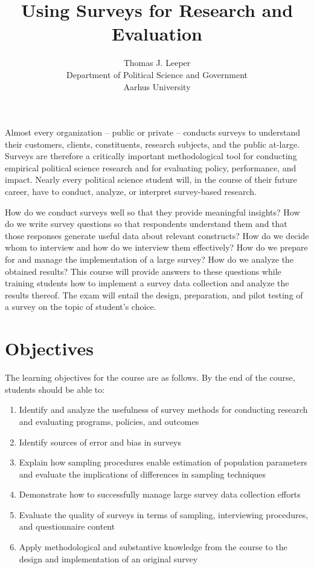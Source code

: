 \documentclass[12pt,a4paper]{article}
\title{Using Surveys for Research and Evaluation}
\author{Thomas J. Leeper\\
Department of Political Science and Government\\
Aarhus University}
\begin{document}
\nobibliography*

\maketitle

\faketableofcontents


Almost every organization – public or private – conducts surveys to understand their customers, clients, constituents, research subjects, and the public at-large. Surveys are therefore a critically important methodological tool for conducting empirical political science research and for evaluating policy, performance, and impact. Nearly every political science student will, in the course of their future career, have to conduct, analyze, or interpret survey-based research.

How do we conduct surveys well so that they provide meaningful insights? How do we write survey questions so that respondents understand them and that those responses generate useful data about relevant constructs? How do we decide whom to interview and how do we interview them effectively? How do we prepare for and manage the implementation of a large survey? How do we analyze the obtained results? This course will provide answers to these questions while training students how to implement a survey data collection and analyze the results thereof. The exam will entail the design, preparation, and pilot testing of a survey on the topic of student's choice.

\section{Objectives}
The learning objectives for the course are as follows. By the end of the course, students should be able to:

\begin{enumerate}
\item Identify and analyze the usefulness of survey methods for conducting research and evaluating programs, policies, and outcomes
\item Identify sources of error and bias in surveys
\item Explain how sampling procedures enable estimation of population parameters and evaluate the implications of differences in sampling techniques
\item Demonstrate how to successfully manage large survey data collection efforts
\item Evaluate the quality of surveys in terms of sampling, interviewing procedures, and questionnaire content 
\item Apply methodological and substantive knowledge from the course to the design and implementation of an original survey
\end{enumerate}
\end{document}
